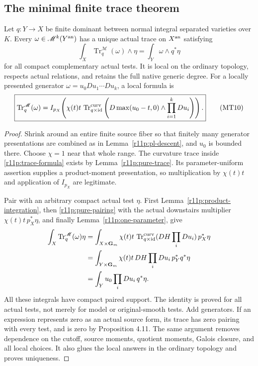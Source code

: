 \subsection{The minimal finite trace theorem}

\begin{theorem}
\label{r11p:minimal-trace-theorem}
Let $q:Y\to X$ be finite dominant between normal integral separated
varieties over $K$.  Every $\omega\in\mathscr M^k(Y^{\rm an})$ has a
unique actual trace on $X^{\rm an}$ satisfying
\[
                 \int_X\operatorname{Tr}^{\mathscr M}_q(\omega)
                                      \wedge\eta
                          =\int_Y\omega\wedge q^*\eta
\tag{MT9}\label{r11p:minimal-pairing}
\]
for all compact complementary actual tests.  It is local on the
ordinary topology, respects actual relations, and retains the full
native generic degree.  For a locally presented generator
$\omega=u_0Du_1\cdots Du_k$, a local formula is
\[
 \boxed{\displaystyle
 \operatorname{Tr}^{\mathscr M}_q(\omega)
 = I_{p_X}\!\left(
     \chi(t)t\,
     \operatorname{Tr}^{\rm curv}_{q\times\operatorname{id}}
       \left(D\max(u_0-t,0)\wedge\prod_{i=1}^kDu_i\right)
                         \right).}
\tag{MT10}\label{r11p:trace-formula}
\]
\end{theorem}

\begin{proof}
Shrink around an entire finite source fiber so that finitely many
generator presentations are combined as in
Lemma~\ref{r11p:pl-descent}, and $u_0$ is bounded there.  Choose
$\chi=1$ near that whole range.  The curvature trace inside
\eqref{r11p:trace-formula} exists by Lemma~\ref{r11p:pure-trace}.
Its parameter-uniform assertion supplies a product-moment presentation,
so multiplication by $\chi(t)t$ and application of $I_{p_X}$ are
legitimate.

Pair with an arbitrary compact actual test $\eta$.  First
Lemma~\ref{r11p:product-integration}, then
\eqref{r11p:pure-pairing} with the actual downstairs multiplier
$\chi(t)t\,p_X^*\eta$, and finally
Lemma~\ref{r11p:one-parameter}, give
\[
\begin{split}
 \int_X\operatorname{Tr}^{\mathscr M}_q(\omega)\eta
 &=\int_{X\times\mathbf G_m}\chi(t)t\,
     \operatorname{Tr}^{\rm curv}_{q\times\operatorname{id}}
        (DH\prod_iDu_i)\,p_X^*\eta\\
 &=\int_{Y\times\mathbf G_m}\chi(t)t\,DH\prod_iDu_i\,
                                          p_Y^*q^*\eta\\
 &=\int_Yu_0\prod_iDu_i\,q^*\eta.
\end{split}
\]
All these integrals have compact paired support.  The identity is
proved for all actual tests, not merely for model or original-smooth
tests.  Add generators.  If an expression represents zero as an
actual source form, its trace has zero pairing with every test, and
is zero by Proposition 4.11.  The same argument removes dependence
on the cutoff, source moments, quotient moments, Galois closure, and
all local choices.  It also glues the local answers in the ordinary
topology and proves uniqueness.
\end{proof}

